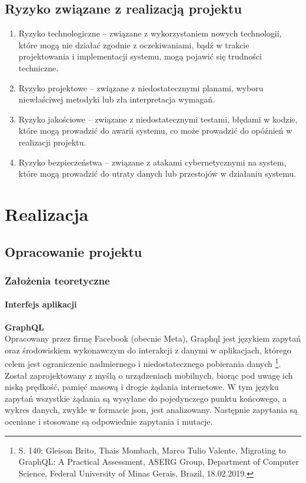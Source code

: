 \documentclass[12pt, a4paper, twoside, openany]{book}
\newcommand{\forceindent}{\leavevmode{\parindent=1.3em\indent}}
\begin{document}
\section{Ryzyko związane z realizacją projektu}

\begin{enumerate}[label=--]
    \item Ryzyko technologiczne -- związane z wykorzystaniem nowych technologii, które mogą nie działać zgodnie z oczekiwaniami, bądź w trakcie projektowania i implementacji systemu, mogą pojawić się trudności techniczne.
    \item Ryzyko projektowe -- związane z niedostatecznymi planami, wyboru niewłaściwej metodyki lub zła interpretacja wymagań.
    \item Ryzyko jakościowe -- związane z niedostatecznymi testami, błędami w kodzie, które mogą prowadzić do awarii systemu, co może prowadzić do opóźnień w realizacji projektu.
    \item Ryzyko bezpieczeństwa -- związane z atakami cybernetycznymi na system, które mogą prowadzić do utraty danych lub przestojów w działaniu systemu.
\end{enumerate}

\chapter{Realizacja}

\section{Opracowanie projektu}

\subsection{Założenia teoretyczne}

\subsubsection{Interfejs aplikacji}

\forceindent \textbf{GraphQL}\\
\forceindent Opracowany przez firmę Facebook (obecnie Meta), Graphql jest językiem zapytań oraz środowiskiem wykonawczym do interakcji z danymi w aplikacjach, którego celem jest ograniczenie nadmiernego i niedostatecznego pobierania danych \footnote{S. 140; Gleison Brito, Thais Mombach, Marco Tulio Valente, Migrating to GraphQL: A Practical Assessment, ASERG Group, Department of Computer Science, Federal University of Minas Gerais, Brazil, 18.02.2019.}. Został zaprojektowany z myślą o urządzeniach mobilnych, biorąc pod uwagę ich niską prędkość, pamięć masową i drogie żądania internetowe.
W tym języku zapytań wszystkie żądania są wysyłane do pojedynczego punktu końcowego, a wykres danych, zwykle w formacie json, jest analizowany. Następnie zapytania są oceniane i stosowane są odpowiednie zapytania i mutacje.
\end{document}
